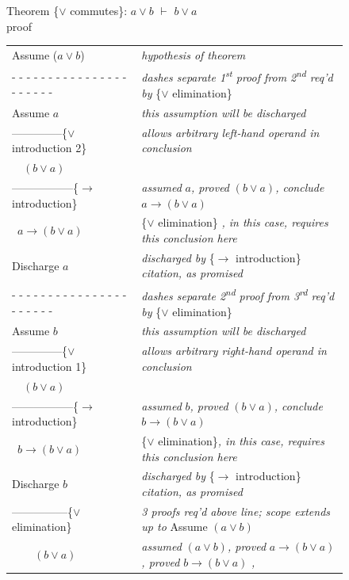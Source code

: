 {\begin{figure}
Theorem \{$\vee$ commutes\}: $a \vee b$ $\vdash$ $b \vee a$ \\
proof
\begin{center}
\begin{tabular}{ll}
Assume ($a \vee b$)          &\emph{hypothesis of theorem}\\
 - - - - - - - - - - - - - - - - - - - - - -&\emph{dashes separate 1\textsuperscript{st} proof from 2\textsuperscript{nd} req'd by} \{$\vee$ elimination\} \\
Assume $a$          &\emph{this assumption will be discharged}\\
--------------\{$\vee$ introduction 2\} &\emph{allows arbitrary left-hand operand in conclusion}\\
~~$(b \vee a)$        &\\
-----------------\{$\rightarrow$ introduction\} &\emph{assumed} $a$\emph{, proved} $(b \vee a)$\emph{, conclude} $a \rightarrow (b \vee a)$ \\
~$a \rightarrow (b \vee a)$ &\{$\vee$ elimination\} \emph{, in this case, requires this conclusion here}\\
Discharge $a$              &\emph{discharged by} \{$\rightarrow$ introduction\} \emph{citation, as promised}\\
 - - - - - - - - - - - - - - - - - - - - - -&\emph{dashes separate 2\textsuperscript{nd} proof from 3\textsuperscript{rd} req'd by} \{$\vee$ elimination\}\\
Assume $b$          &\emph{this assumption will be discharged}\\
--------------\{$\vee$ introduction 1\} &\emph{allows arbitrary right-hand operand in conclusion}\\
~~$(b \vee a)$        &\\
-----------------\{$\rightarrow$ introduction\} &\emph{assumed} $b$\emph{, proved} $(b \vee a)$\emph{, conclude} $b \rightarrow (b \vee a)$\\
~$b \rightarrow (b \vee a)$ &\{$\vee$ elimination\}\emph{, in this case, requires this conclusion here}\\
Discharge $b$              &\emph{discharged by} \{$\rightarrow$ introduction\} \emph{citation, as promised}\\
---------------\{$\vee$ elimination\}       &\emph{3 proofs req'd above line; scope extends up to} Assume $(a \vee b)$\\
~~~~$(b \vee a)$        &\emph{assumed} $(a \vee b)$\emph{, proved} $a \rightarrow (b \vee a)$\emph{, proved} $b \rightarrow (b \vee a)$ \emph{,}\\

\end{tabular}
\end{center}
\end{figure}}
